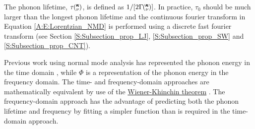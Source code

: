 The phonon lifetime, $\tau \mspace{-4.0mu}\left(\mspace{-8.0mu} \begin{smallmatrix}&\pmb{\kappa} \\&\nu \end{smallmatrix}\mspace{-3.0mu}\right)$, is defined as $1/[2 \Gamma \mspace{-4.0mu}\left(\mspace{-8.0mu} \begin{smallmatrix}&\pmb{\kappa} \\&\nu \end{smallmatrix}\mspace{-3.0mu}\right)]$. 
In practice, $\tau_0$ should 
be much larger than the longest phonon lifetime and the continuous 
fourier transform in 
Equation \eqref{A:E:Lorentzian_NMD}  
is performed using a discrete fast fourier transform (see Section 
\ref{S:Subsection_prop_LJ}, 
\ref{S:Subsection_prop_SW} and \ref{S:Subsection_prop_CNT}).

Previous work using normal mode analysis has represented the phonon 
energy in the time domain 
\cite{ladd_lattice_1986,mcgaughey_quantitative_2004,
henry_spectral_2008,turney_predicting_2009,
goicochea_thermal_2010,he_thermal_2011}, while $\Phi$ is a 
representation of the phonon energy in the frequency domain. The 
time- and frequency-domain 
approaches are mathematically equivalent by use of the 
\href{http://en.wikipedia.org/wiki/Wiener\%E2\%80\%93Khinchin_theorem}
{Wiener-Khinchin theorem} 
\cite{rudin_real_1987,shiomi_thermal_2011}. The frequency-domain 
approach has the 
advantage of predicting 
both the phonon lifetime and frequency by fitting a simpler function 
than is required in the 
time-domain approach.
